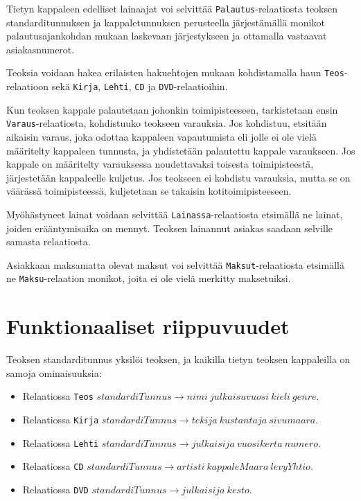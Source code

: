 \documentclass[12pt,titlepage] {article}
\begin{document}
Tietyn kappaleen edelliset lainaajat voi selvittää \texttt{Palautus}-relaatiosta teoksen standarditunnuksen ja kappaletunnuksen perusteella järjestämällä monikot palautusajankohdan mukaan laskevaan järjestykseen ja ottamalla vastaavat asiakasnumerot.

Teoksia voidaan hakea erilaisten hakuehtojen mukaan kohdistamalla haun \texttt{Teos}-relaatioon sekä \texttt{Kirja}, \texttt{Lehti}, \texttt{CD} ja \texttt{DVD}-relaatioihin.

Kun teoksen kappale palautetaan johonkin toimipisteeseen, tarkistetaan ensin \texttt{Varaus}-relaatiosta, kohdistuuko teokseen varauksia. Jos kohdistuu, etsitään aikaisin varaus, joka odottaa kappaleen vapautumista eli jolle ei ole vielä määritelty kappaleen tunnusta, ja yhdistetään palautettu kappale varaukseen. Jos kappale on määritelty varauksessa noudettavaksi toisesta toimipisteestä, järjestetään kappaleelle kuljetus. Jos teokseen ei kohdistu varauksia, mutta se on väärässä toimipisteessä, kuljetetaan se takaisin kotitoimipisteeseen.

Myöhästyneet lainat voidaan selvittää \texttt{Lainassa}-relaatiosta etsimällä ne lainat, joiden erääntymisaika on mennyt. Teoksen lainannut asiakas saadaan selville samasta relaatiosta.

Asiakkaan maksamatta olevat maksut voi selvittää \texttt{Maksut}-relaatiosta etsimällä ne \texttt{Maksu}-relaation monikot, joita ei ole vielä merkitty maksetuiksi.

\section {Funktionaaliset riippuvuudet}

Teoksen standarditunnus yksilöi teoksen, ja kaikilla tietyn teoksen kappaleilla on samoja ominaisuuksia:

\begin{itemize}
\item Relaatiossa \texttt{Teos} $standardiTunnus \rightarrow nimi\ julkaisuvuosi\ kieli\ genre$.
\item Relaatiossa \texttt{Kirja} $standardiTunnus \rightarrow tekija\ kustantaja\ sivumaara$.
\item Relaatiossa \texttt{Lehti} $standardiTunnus \rightarrow julkaisija\ vuosikerta\ numero$.
\item Relaatiossa \texttt{CD} $standardiTunnus \rightarrow artisti\ kappaleMaara\ levyYhtio$.
\item Relaatiossa \texttt{DVD} $standardiTunnus \rightarrow julkaisija\ kesto$.
\end{itemize}
\end{document}
